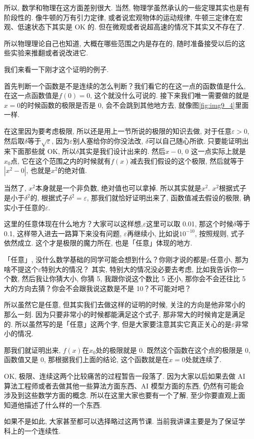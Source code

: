 所以, 数学和物理在这方面差别很大. 当然, 物理学虽然承认的一些定理其实也是有阶段性的. 像牛顿的万有引力定律, 或者说宏观物体的运动规律, 牛顿三定律在宏观、低速状态下其实是 OK 的. 但在微观或者说超高速的情况下其实又不存在了. 

所以物理理论自己也知道, 大概在哪些范围之内是存在的, 随时准备接受以后的这些实验来推翻或者说改进它. 

我们来看一下刚才这个证明的例子. 

首先判断一个函数是不是连续的怎么判断？我们看它的在这一点的函数值是什么, 在这一点函数值是$f(0) = 0$, 这个就没什么可说的. 接下来我们唯一需要做的就是$x=0$的时候函数的极限是否是 0, 会不会跳到其他地方去, 就像图\ref{fig:img9_4}里面一样. 

在这里因为要考虑极限, 所以还是用上一节所说的极限的知识去做, 对于任意$\varepsilon > 0$,  然后取$\delta$等于$\sqrt{\varepsilon}$, 因为$\varepsilon$别人塞给你的你没法改, $\delta$可以自己随心所欲. 只要能证明出来下面那些就 OK, 所以$\delta$其实是我们设计出来的. 然后$x-0$, 0 这一点实际上就是$x_0$点, 它在这个范围之内的时候就有$f(x)$减去我们假设的这个极限, 然后就等于$|x^2 - 0|$, 也就是$x^2$的绝对值. 

当然了, $x^2$本身就是一个非负数, 绝对值也可以拿掉. 所以其实就是$x^2$. $x^2$根据式子是小于$\delta^2$的, 根据式子$\delta^2 = \varepsilon$,  那我们就恰好证明出来了, 函数值减去假设的极限, 确实小于任意的$\varepsilon$. 

这里的任意体现在什么地方？大家可以这样想,$\varepsilon$这里可以取 0.01, 那这个时候$\delta$等于 0.1, 这样带入进去一路算下来没有问题, $\varepsilon$再继续小, 比如说$10^{-10}$, 按照规则, 式子依然成立. 这个才是极限的魔力所在, 也是「任意」体现的地方. 

「任意」, 没什么数学基础的同学可能会想到什么？你刚才说的都是$\varepsilon$任意小, 那为啥不提这个$\varepsilon$特别大的情况？ 其实, 特别大的情况没必要去考虑, 比如我告诉你一个数, 然后我让你猜大小, 你猜 5, 我跟你说这个数比 5 还小, 那你会不会还往比 5 大的方向去猜？你会不会跟我说这数是不是 10？不可能对吧？

所以虽然它是任意, 但其实我们去做这样的证明的时候, 关注的方向是他非常小的那么一刻. 因为只要非常小的时候都能满足这个式子, 那非常大的时候肯定是满足的. 所以虽然写的是「任意」这两个字, 但是大家要注意其实它真正关心的是$\varepsilon$非常小的情况. 

那我们就证明出来, $f(x)$在$x_0$处的极限就是 0. 既然这个函数在这个点的极限是 0, 函数值又是 0, 那根据我们上面的结论, 这个函数就是在$x=0$处就连续了. 

OK, 极限、连续这两个比较痛苦的过程暂告一段落了. 因为大家以后如果去做 AI 算法工程师或者去做其他一些算法方面东西、AI 模型方面的东西, 仍然有可能会涉及到这些数学方面的概念. 所以在这里大家也要有一个了解, 至少你要直观上面知道他描述了什么样的一个东西. 

如果不是如此, 大家甚至都可以选择略过这两节课. 当前我讲课主要是为了保证学科上的一个连续性. 
